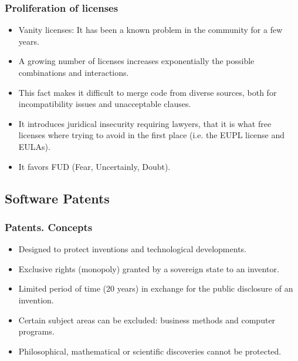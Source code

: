 \begin{frame}
\frametitle{Proliferation of licenses}

\begin{itemize}
\item Vanity licenses: It has been a known problem in the community for a few years.
\item A growing number of licenses increases exponentially the possible combinations and interactions. 
\item This fact makes it difficult to merge code from diverse sources, both for incompatibility issues and unacceptable clauses.
\item It introduces juridical insecurity requiring lawyers, that it is what free licenses where trying to avoid in the first place (i.e. the EUPL license and EULAs).
\item It favors FUD (Fear, Uncertainly, Doubt).
\end{itemize}                                                 

\end{frame}


\subsection{Software Patents}

\begin{frame}
\frametitle{Patents. Concepts}

\begin{itemize}
\item Designed to protect \alert{inventions} and \alert{technological developments}. 
\item \alert{Exclusive rights} (monopoly) granted by a sovereign state to an inventor.
\item Limited period of time (20 years) in exchange for the \alert{public disclosure} of an \alert{invention}.
\item Certain subject areas can be excluded: business methods and computer programs.
\item Philosophical, mathematical or scientific discoveries cannot be protected.
\end{itemize}                                                 

\end{frame}

